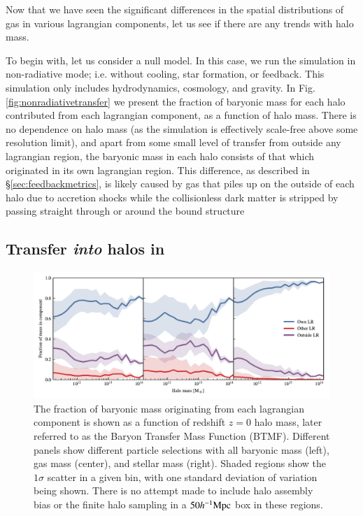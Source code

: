 Now that we have seen the significant differences in the spatial distributions
of gas in various lagrangian components, let us see if there are any trends
with halo mass.

To begin with, let us consider a null model. In this case, we run the
simulation in non-radiative mode; i.e. without cooling, star formation, or
feedback. This simulation only includes hydrodynamics, cosmology, and
gravity. In Fig. \ref{fig:nonradiativetransfer} we present the fraction of
baryonic mass for each halo contributed from each lagrangian component, as a
function of halo mass. There is no dependence on halo mass (as the simulation
is effectively scale-free above some resolution limit), and apart from some
small level of transfer from outside any lagrangian region, the baryonic mass
in each halo consists of that which originated in its own lagrangian region.
This difference, as described in \S \ref{sec:feedbackmetrics}, is likely
caused by gas that piles up on the outside of each halo due to accretion
shocks while the collisionless dark matter is stripped by passing straight
through or around the bound structure

\subsection{Transfer \emph{into} halos in \simba{}}

\begin{figure}
	\centering
	\includegraphics{figures/s50j7kAHF/component_fraction_mixed.pdf}
	\vspace{-0.7cm}
	\caption{
		The fraction of baryonic mass originating from each lagrangian component is
		shown as a function of redshift $z=0$ halo mass, later referred to as the
		Baryon Transfer Mass Function (BTMF). Different panels show different
		particle selections with all baryonic
		mass (left), gas mass (center), and stellar mass (right). Shaded
		regions show the $1\sigma$ scatter in a given bin, with one standard
		deviation of variation being shown. There is no attempt made to include
		halo assembly bias or the finite halo sampling in a $50h^{-1}{\rm Mpc}{}$ box in
		these regions.
	}
	\label{fig:maintransferresult}
\end{figure}

